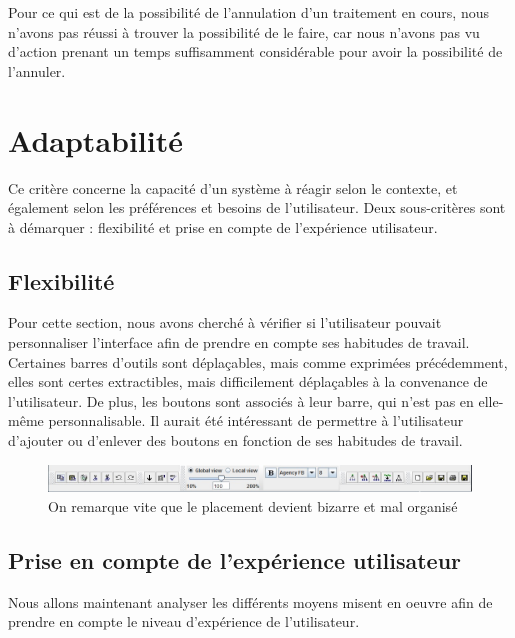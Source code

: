 \documentclass[12pt, a4paper]{article}
\begin{document}
Pour ce qui est de la possibilité de l'annulation d'un traitement en cours, nous n'avons pas réussi à trouver la possibilité de le faire, car nous n'avons pas vu d'action prenant un temps suffisamment considérable pour avoir la possibilité de l'annuler.

\section{Adaptabilité}
Ce critère concerne la capacité d'un système à réagir selon le contexte, et également selon les préférences et besoins de l'utilisateur. Deux sous-critères sont à démarquer : flexibilité et prise en compte de l'expérience utilisateur. 

\subsection{Flexibilité}
Pour cette section, nous avons cherché à vérifier si l'utilisateur pouvait personnaliser l'interface afin de prendre en compte ses habitudes de travail. \\


Certaines barres d'outils sont déplaçables, mais comme exprimées précédemment, elles sont certes extractibles, mais difficilement déplaçables à la convenance de l'utilisateur. De plus, les boutons sont associés à leur barre, qui n'est pas en elle-même personnalisable. Il aurait été intéressant de permettre à l'utilisateur d'ajouter ou d'enlever des boutons en fonction de ses habitudes de travail.
\begin{figure}[h]
\begin{center}
   \includegraphics[scale = 0.5]{bazzare.jpg}
	\caption{On remarque vite que le placement devient bizarre et mal organisé}
	\end{center}
\end{figure}
\newpage
\subsection{Prise en compte de l'expérience utilisateur}
Nous allons maintenant analyser les différents moyens misent en oeuvre afin de prendre en compte le niveau d'expérience de l'utilisateur.\\
\end{document}
